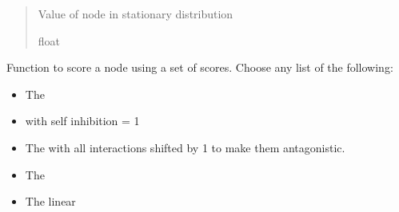 \documentclass[letterpaper,10pt,english]{sphinxmanual}
\begin{document}
\begin{fulllineitems}
\begin{fulllineitems}
\begin{quote}
\begin{description}
\sphinxAtStartPar
Value of node in stationary distribution

\sphinxAtStartPar
float

\end{description}\end{quote}

\end{fulllineitems}


\begin{fulllineitems}
\label{\detokenize{friendlynets:friendlyNet.friendlyNet.score_node}}
\pysigstartsignatures
{}
\pysigstopsignatures
\sphinxAtStartPar
Function to score a node using a set of scores. Choose any list of the following:
\begin{itemize}
\item {} 
\sphinxAtStartPar
{} The {\hyperref[\detokenize{friendlynets:friendlyNet.friendlyNet.lotka_volterra_system}]{}}

\item {} 
\sphinxAtStartPar
{} {\hyperref[\detokenize{friendlynets:friendlyNet.friendlyNet.lotka_volterra_system}]{}} with self inhibition = 1

\item {} 
\sphinxAtStartPar
{} The {\hyperref[\detokenize{friendlynets:friendlyNet.friendlyNet.lotka_volterra_system}]{}} with all interactions shifted by \sphinxhyphen{}1 to make them antagonistic.

\item {} 
\sphinxAtStartPar
{} The {\hyperref[\detokenize{friendlynets:friendlyNet.friendlyNet.replicator_system}]{}}

\item {} 
\sphinxAtStartPar
{} The linear {\hyperref[\detokenize{friendlynets:friendlyNet.friendlyNet.node_balanced_score}]{}}


\end{itemize}
\end{fulllineitems}
\end{fulllineitems}
\end{document}
